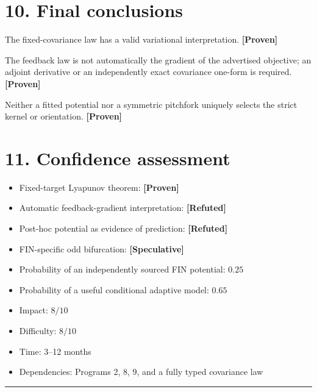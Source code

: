 \documentclass[11pt,a4paper,openany]{report}
\newcommand{\statusProven}{\textcolor{fingreen}{[Proven]}}
\newcommand{\statusSpeculative}{\textcolor{finorange}{[Speculative]}}
\newcommand{\statusRefuted}{\textcolor{finred}{[Refuted]}}
\begin{document}
\section{10. Final conclusions}

The fixed-covariance law has a valid variational interpretation. \textbf{\statusProven{}}

The feedback law is not automatically the gradient of the advertised objective; an adjoint derivative or an independently exact covariance one-form is required. \textbf{\statusProven{}}

Neither a fitted potential nor a symmetric pitchfork uniquely selects the strict kernel or orientation. \textbf{\statusProven{}}

\section{11. Confidence assessment}

\begin{itemize}
\item 
Fixed-target Lyapunov theorem: \textbf{\statusProven{}}

\item 
Automatic feedback-gradient interpretation: \textbf{\statusRefuted{}}

\item 
Post-hoc potential as evidence of prediction: \textbf{\statusRefuted{}}

\item 
FIN-specific odd bifurcation: \textbf{\statusSpeculative{}}

\item 
Probability of an independently sourced FIN potential: \(0.25\)

\item 
Probability of a useful conditional adaptive model: \(0.65\)

\item 
Impact: \(8/10\)

\item 
Difficulty: \(8/10\)

\item 
Time: 3–12 months

\item 
Dependencies: Programs 2, 8, 9, and a fully typed covariance law

\end{itemize}

\par\medskip\hrule\medskip
\end{document}
